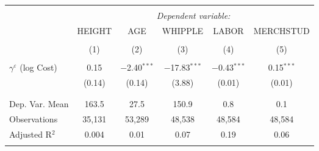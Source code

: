 
\begin{tabular}{@{\extracolsep{5pt}}lccccc} 
\\[-1.8ex]\hline 
\hline \\[-1.8ex] 
 & \multicolumn{5}{c}{\textit{Dependent variable:}} \\ 
\cline{2-6} 
 & HEIGHT & AGE & WHIPPLE & LABOR & MERCHSTUD \\ 
\\[-1.8ex] & (1) & (2) & (3) & (4) & (5)\\ 
\hline \\[-1.8ex] 
 $\gamma^{\varepsilon}$ (log Cost) & 0.15 & $-$2.40$^{***}$ & $-$17.83$^{***}$ & $-$0.43$^{***}$ & 0.15$^{***}$ \\ 
  & (0.14) & (0.14) & (3.88) & (0.01) & (0.01) \\ 
  & & & & & \\ 
\hline \\[-1.8ex] 
Dep. Var. Mean & 163.5 & 27.5 & 150.9 & 0.8 & 0.1 \\ 
Observations & 35,131 & 53,289 & 48,538 & 48,584 & 48,584 \\ 
Adjusted R$^{2}$ & 0.004 & 0.01 & 0.07 & 0.19 & 0.06 \\ 
\hline 
\hline \\[-1.8ex] 
\end{tabular} 
